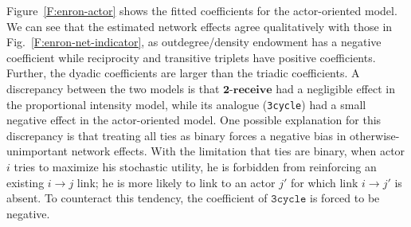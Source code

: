 \documentclass[final]{statsoc}
\begin{document}
Figure~\ref{F:enron-actor} shows the fitted coefficients for the
actor-oriented model.  We can see that the estimated network effects agree
qualitatively with those in Fig.~\ref{F:enron-net-indicator}, as
outdegree/density endowment has a negative coefficient while reciprocity and
transitive triplets have positive coefficients.  Further, the dyadic
coefficients are larger than the triadic coefficients.  A discrepancy between
the two models is that $\textbf{2-receive}$ had a negligible effect in the
proportional intensity model, while its analogue (\texttt{3cycle}) had a small
negative effect in the actor-oriented model.  One possible explanation for
this discrepancy is that treating all ties as binary forces a negative bias in
otherwise-unimportant network effects.  With the limitation that ties are
binary, when actor $i$ tries to maximize his stochastic utility, he is
forbidden from reinforcing an existing $i \to j$ link; he is more
likely to link to an actor $j'$ for which link $i \to j'$ is absent.
To counteract this tendency, the coefficient of $\texttt{3cycle}$ is
forced to be negative.
\end{document}
